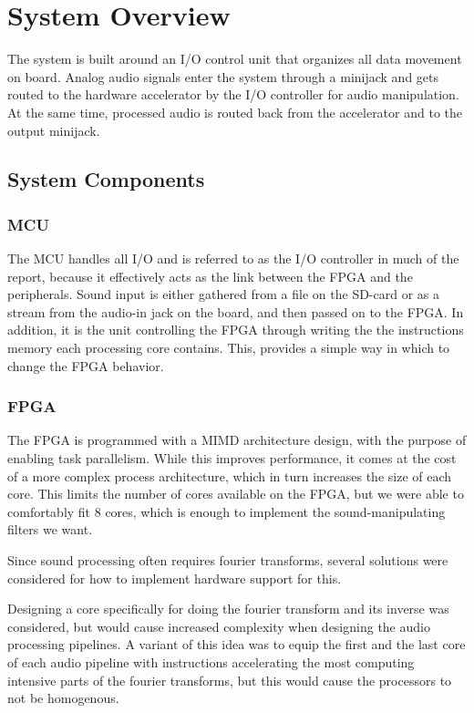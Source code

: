 \section{System Overview}

The system is built around an I/O control unit that organizes all data movement
on board. Analog audio signals enter the system through a minijack and gets
routed to the hardware accelerator by the I/O controller for audio manipulation.
At the same time, processed audio is routed back from the accelerator and to the
output minijack.

\subsection{System Components}
\subsubsection{MCU}\label{intro:system-components-mcu}

The MCU handles all I/O and is referred to as the I/O controller in much of the
report, because it effectively acts as the link between the FPGA and the
peripherals. Sound input is either gathered from a file on the SD-card or as a
stream from the audio-in jack on the board, and then passed on to the FPGA. In
addition, it is the unit controlling the FPGA through writing the the
instructions memory each processing core contains. This, provides a simple way
in which to change the FPGA behavior.

\subsubsection{FPGA}

The FPGA is programmed with a MIMD architecture design, with the purpose of
enabling task parallelism. While this improves performance, it comes at the cost
of a more complex process architecture, which in turn increases the size of each
core. This limits the number of cores available on the FPGA, but we were able to
comfortably fit 8 cores, which is enough to implement the sound-manipulating
filters we want.


Since sound processing often requires fourier transforms, several solutions were
considered for how to implement hardware support for this.

Designing a core specifically for doing the fourier transform and its inverse
was considered, but would cause increased complexity when designing the audio
processing pipelines. A variant of this idea was to equip the first and the last
core of each audio pipeline with instructions accelerating the most computing
intensive parts of the fourier transforms, but this would cause the processors
to not be homogenous.

